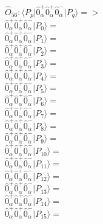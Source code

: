 \documentclass[14pt]{article}
\begin{document}
    $\hat{O}_{56}:  \langle{P_p}\vert \hat{0}_{\alpha}^{+}\hat{0}_{\alpha}^{+}\hat{0}_{\alpha}^{-} \vert{P_q}\rangle => $ \\ 
    $ \hat{0}_{\alpha}^{+}\hat{0}_{\alpha}^{+}\hat{0}_{\alpha}^{-} \vert{P_{0}}\rangle =  $ \\ 
    $ \hat{0}_{\alpha}^{+}\hat{0}_{\alpha}^{+}\hat{0}_{\alpha}^{-} \vert{P_{1}}\rangle =  $ \\ 
    $ \hat{0}_{\alpha}^{+}\hat{0}_{\alpha}^{+}\hat{0}_{\alpha}^{-} \vert{P_{2}}\rangle =  $ \\ 
    $ \hat{0}_{\alpha}^{+}\hat{0}_{\alpha}^{+}\hat{0}_{\alpha}^{-} \vert{P_{3}}\rangle =  $ \\ 
    $ \hat{0}_{\alpha}^{+}\hat{0}_{\alpha}^{+}\hat{0}_{\alpha}^{-} \vert{P_{4}}\rangle =  $ \\ 
    $ \hat{0}_{\alpha}^{+}\hat{0}_{\alpha}^{+}\hat{0}_{\alpha}^{-} \vert{P_{5}}\rangle =  $ \\ 
    $ \hat{0}_{\alpha}^{+}\hat{0}_{\alpha}^{+}\hat{0}_{\alpha}^{-} \vert{P_{6}}\rangle =  $ \\ 
    $ \hat{0}_{\alpha}^{+}\hat{0}_{\alpha}^{+}\hat{0}_{\alpha}^{-} \vert{P_{7}}\rangle =  $ \\ 
    $ \hat{0}_{\alpha}^{+}\hat{0}_{\alpha}^{+}\hat{0}_{\alpha}^{-} \vert{P_{8}}\rangle =  $ \\ 
    $ \hat{0}_{\alpha}^{+}\hat{0}_{\alpha}^{+}\hat{0}_{\alpha}^{-} \vert{P_{9}}\rangle =  $ \\ 
    $ \hat{0}_{\alpha}^{+}\hat{0}_{\alpha}^{+}\hat{0}_{\alpha}^{-} \vert{P_{10}}\rangle =  $ \\ 
    $ \hat{0}_{\alpha}^{+}\hat{0}_{\alpha}^{+}\hat{0}_{\alpha}^{-} \vert{P_{11}}\rangle =  $ \\ 
    $ \hat{0}_{\alpha}^{+}\hat{0}_{\alpha}^{+}\hat{0}_{\alpha}^{-} \vert{P_{12}}\rangle =  $ \\ 
    $ \hat{0}_{\alpha}^{+}\hat{0}_{\alpha}^{+}\hat{0}_{\alpha}^{-} \vert{P_{13}}\rangle =  $ \\ 
    $ \hat{0}_{\alpha}^{+}\hat{0}_{\alpha}^{+}\hat{0}_{\alpha}^{-} \vert{P_{14}}\rangle =  $ \\ 
    $ \hat{0}_{\alpha}^{+}\hat{0}_{\alpha}^{+}\hat{0}_{\alpha}^{-} \vert{P_{15}}\rangle =  $ \\ 
    
\end{document}
